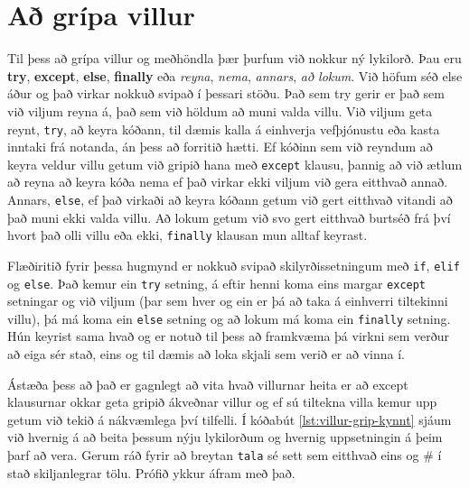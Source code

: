 \section{Að grípa villur}\label{uk:villur-grípa}
Til þess að grípa villur og meðhöndla þær þurfum við nokkur ný lykilorð.
Þau eru \textbf{try}, \textbf{except}, \textbf{else}, \textbf{finally} eða \textit{reyna}, \textit{nema}, \textit{annars}, \textit{að lokum}.
Við höfum séð else áður og það virkar nokkuð svipað í þessari stöðu.
Það sem try gerir er það sem við viljum reyna á, það sem við höldum að muni valda villu.
Við viljum geta reynt, \texttt{try}, að keyra kóðann, til dæmis kalla á einhverja vefþjónustu eða kasta inntaki frá notanda, án þess að forritið hætti.
Ef kóðinn sem við reyndum að keyra veldur villu getum við gripið hana með \texttt{except} klausu, þannig að við ætlum að reyna að keyra kóða nema ef það virkar ekki viljum við gera eitthvað annað.
Annars, \texttt{else}, ef það virkaði að keyra kóðann getum við gert eitthvað vitandi að það muni ekki valda villu.
Að lokum getum við svo gert eitthvað burtséð frá því hvort það olli villu eða ekki, \texttt{finally} klausan mun alltaf keyrast.

Flæðiritið fyrir þessa hugmynd er nokkuð svipað skilyrðissetningum með \texttt{if}, \texttt{elif} og \texttt{else}.
Það kemur ein \texttt{try} setning, á eftir henni koma eins margar \texttt{except} setningar og við viljum (þar sem hver og ein er þá að taka á einhverri tiltekinni villu), þá má koma ein \texttt{else} setning og að lokum má koma ein \texttt{finally} setning.
Hún keyrist sama hvað og er notuð til þess að framkvæma þá virkni sem verður að eiga sér stað, eins og til dæmis að loka skjali sem verið er að vinna í.

Ástæða þess að það er gagnlegt að vita hvað villurnar heita er að except klausurnar okkar geta gripið ákveðnar villur og ef sú tiltekna villa kemur upp getum við tekið á nákvæmlega því tilfelli.
Í kóðabút \ref{lst:villur-grip-kynnt} sjáum við hvernig á að beita þessum nýju lykilorðum og hvernig uppsetningin á þeim þarf að vera.
Gerum ráð fyrir að breytan \texttt{tala} sé sett sem eitthvað eins og \# í stað skiljanlegrar tölu.
Prófið ykkur áfram með það.

